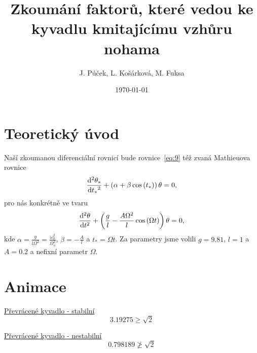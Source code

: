 \documentclass{beamer}
\title[Převrácené kyvadlo]{Zkoumání faktorů, které vedou ke kyvadlu kmitajícímu vzhůru nohama}
\author[J. P., L. K., M. F.]{J. Púček, L. Košárková, M. Fuksa}
\institute[Univerzita Karlova]{Univerzita Karlova, Česká republika}
\date{\today}
\begin{document}
\begin{frame}
\titlepage
\end{frame}

\section{Teoretický úvod}
\label{sec:uvod}

\begin{frame}
\begin{center}
			Naší zkoumanou diferenciální rovnicí bude rovnice~\eqref{eq:9} též zvaná Mathieuova rovnice
		\begin{equation}
			\label{eq:9}
			\frac{\mathrm{d}^2 {\theta_{*}}}{\mathrm{d} {t_{*}}^2}
			+
			\left(
			\alpha
			+
			\beta \cos \left( t_{*} \right)
			\right)
			\theta
			=
			0
			,
		\end{equation}
			pro nás konkrétně ve tvaru
		\begin{equation}
			\label{eq:10}
			\frac{\mathrm{d}^2 {\theta}}{\mathrm{d} {t}^2}
			+
			\left(
			\frac{g}{l}
			-
			\frac{A \Omega^2}{l} \cos \left( \Omega t \right)
			\right)
			\theta
			=
			0
			,
		\end{equation}
			kde $\alpha=\frac{g}{l\Omega^2}=\frac{\omega_{o}^2}{\Omega_{o}^2}$, $ \beta=-\frac{A}{l}$ a $t_{*}=\Omega t$. Za parametry jsme volili $g=9.81$, $l=1$ a $A=0.2$ a nefixní parametr $\Omega$.
		\end{center}
\end{frame}

\section{Animace}
\label{sec:animace}

\begin{frame}
\begin{center}
\href{run:./animace.mp4}{Převrácené kyvadlo - stabilní}
\begin{equation*}
3.19275 \geq \sqrt{2}
\end{equation*}
\end{center}
\end{frame}

\begin{frame}
\begin{center}
\href{run:./animace2.mp4}{Převrácené kyvadlo - nestabilní}
\begin{equation*}
0.798189 \ngeq \sqrt{2}
\end{equation*}
\end{center}
\end{frame}
\end{document}
